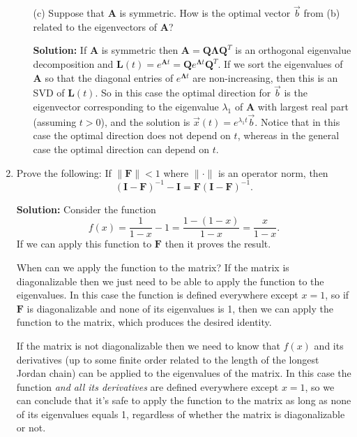 \documentclass[11pt,fleqn]{article}
\newcommand{\mat}[1]{\mathbf{#1}}
\begin{document}
\begin{enumerate}
\begin{itemize}
	\item[(c)] Suppose that $\mathbf{A}$ is symmetric. How is the optimal vector $\vec{b}$ from (b) related to the eigenvectors of $\mathbf{A}$?
	
	{\bf Solution:} If $\mathbf{A}$ is symmetric then $\mathbf{A} = \mathbf{Q\Lambda Q}^T$ is an orthogonal eigenvalue decomposition and $\mathbf{L}(t) = e^{\mathbf{A}t} = \mathbf{Q}e^{\mathbf{\Lambda} t}\mathbf{Q}^T$.
	If we sort the eigenvalues of $\mathbf{A}$ so that the diagonal entries of $e^{\mathbf{\Lambda} t}$ are non-increasing, then this is an SVD of $\mathbf{L}(t)$. So in this case the optimal direction for $\vec{b}$ is the eigenvector corresponding to the eigenvalue $\lambda_1$ of $\mathbf{A}$ with largest real part (assuming $t>0$), and the solution is $\vec{x}(t) = e^{\lambda_1 t}\vec{b}$. Notice that in this case the optimal direction does not depend on $t$, whereas in the general case the optimal direction can depend on $t$.
	
\end{itemize}
\item Prove the following: If $\|\mat{F}\|<1$ where $\|\cdot\|$ is an operator norm, then 
\[(\mat{I}-\mat{F})^{-1} - \mat{I} = \mat{F}(\mat{I}-\mat{F})^{-1}.\]

{\bf Solution:} Consider the function
\[f(x) = \frac{1}{1-x} -1 = \frac{1 - (1-x)}{1-x} = \frac{x}{1-x}.\]
If we can apply this function to $\mathbf{F}$ then it proves the result.

When can we apply the function to the matrix? If the matrix is diagonalizable then we just need to be able to apply the function to the eigenvalues.
In this case the function is defined everywhere except $x=1$, so if $\mathbf{F}$ is diagonalizable and none of its eigenvalues is 1, then we can apply the function to the matrix, which produces the desired identity.

If the matrix is not diagonalizable then we need to know that $f(x)$ and its derivatives (up to some finite order related to the length of the longest Jordan chain) can be applied to the eigenvalues of the matrix.
In this case the function {\it and all its derivatives} are defined everywhere except $x=1$, so we can conclude that it's safe to apply the function to the matrix as long as none of its eigenvalues equals 1, regardless of whether the matrix is diagonalizable or not.


\end{enumerate}
\end{document}
